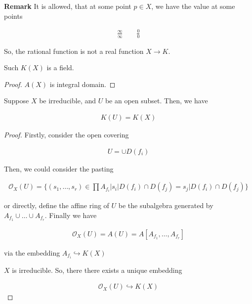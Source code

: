 \documentclass[Total.tex]{subfiles}
\begin{document}
		\textbf{Remark} It is allowed, that at some point $p\in X$, we have the value at some points
		
		\begin{gather*}
			\frac{\infty}{\infty}\qquad \frac{0}{0}
		\end{gather*}
		
		So, the rational function is not a real function $X\rightarrow K$.
		
		\begin{proposition}
			Such $K(X)$ is a field.
		\end{proposition}
		
		\begin{proof}
			$A(X)$ is integral domain.
		\end{proof}
		
		\begin{proposition}
			Suppose $X$ be irreducible, and $U$ be an open subset. Then, we have
			
			\begin{gather*}
				K(U)=K(X)
			\end{gather*}
		\end{proposition}
		
		\begin{proof}
			Firstly, consider the open covering
			
			\begin{gather*}
				U=\cup D(f_i)
			\end{gather*}
			
			Then, we could consider the pasting
			
			\begin{gather*}
				\mathcal{O}_X(U)=\{(s_1,\dots,s_r)\in \prod A_{f_i}|s_i|D(f_i)\cap D(f_j)=s_j|D(f_i)\cap D(f_j)\}
			\end{gather*}
			
			or directly, define the affine ring of $U$ be the subalgebra generated by $A_{f_1}\cup \dots\cup A_{f_r}$. Finally we have
			
			\begin{gather*}
				\mathcal{O}_X(U)=A(U)=A[A_{f_1},\dots,A_{f_r}]
			\end{gather*}
			
			via the embedding $A_{f_i}\hookrightarrow K(X)$
			
			$X$ is irreducible. So, there there exists a unique embedding
			
			\begin{gather*}
				\mathcal{O}_X(U)\hookrightarrow K(X)
			\end{gather*}
		\end{proof}
		
\end{document}
